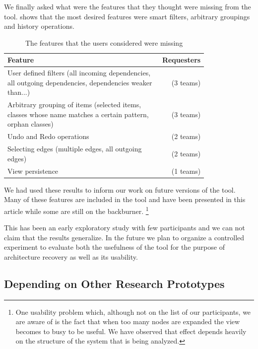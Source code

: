 \documentclass[preprint,12pt]{elsarticle}
\begin{document}
We finally asked what were the features that they thought were missing from the tool.  shows that the most desired features were smart filters, arbitrary groupings and history operations.

\begin{table}[ht]
\begin{center}
\begin{tabular}{p{0.8\linewidth} r}
\footnotesize {Feature} &\footnotesize{ Requesters} \\
\hline
\footnotesize {User defined filters (all incoming dependencies, all outgoing dependencies, dependencies weaker than...)} &\footnotesize{ (3 teams)} \\
\footnotesize {Arbitrary grouping of items (selected items, classes whose name matches a certain pattern, orphan classes)} &\footnotesize{ (3 teams)} \\
\footnotesize {Undo and Redo operations} &\footnotesize{ (2 teams)} \\
\footnotesize {Selecting edges (multiple edges, all outgoing edges)} &\footnotesize{ (2 teams)} \\
\footnotesize {View persistence} &\footnotesize{ (1 teams)} \\
\hline

\end{tabular}
\caption{The features that the users considered were missing}
\label{tab:missing}
\end{center}
\end{table}

We had used these results to inform our work on future versions of the tool. Many of these features are included in the tool and have been presented in this article while some are still on the backburner. \footnote{One usability problem which, although not on the list of our participants, we are aware of is the fact that when too many nodes are expanded the view becomes to busy to be useful. We have observed that effect depends heavily on the structure of the system that is being analyzed. }


This has been an early exploratory study with few participants and we can not claim that the results generalize. In the future we plan to organize a controlled experiment to evaluate both the usefulness of the tool for the purpose of architecture recovery as well as its usability.

\subsection {Depending on Other Research Prototypes }
\end{document}
